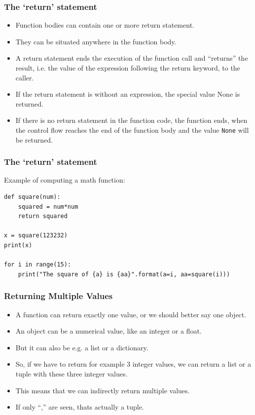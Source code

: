 \begin{frame}[fragile]\frametitle{The `return' statement }
    \begin{itemize}
    \item  Function bodies can contain one or more return statement. 
    \item They can be situated anywhere in the function body. 
    \item A return statement ends the execution of the function call and ``returns'' the result, i.e. the value of the expression following the return keyword, to the caller.
    \item If the return statement is without an expression, the special value None is returned.
    \item If there is no return statement in the function code, the function ends, when the control flow reaches the end of the function body and the value \texttt{None} will be returned.
    \end{itemize}
\end{frame}



\begin{frame}[fragile]\frametitle{The `return' statement }
Example of computing a math function:
\begin{lstlisting}
def square(num):
    squared = num*num
    return squared

x = square(123232)
print(x)

for i in range(15):
    print("The square of {a} is {aa}".format(a=i, aa=square(i)))
\end{lstlisting}
\end{frame}

\begin{frame}[fragile]\frametitle{Returning Multiple Values}
    \begin{itemize}
    \item  A function can return exactly one value, or we should better say one object. 
    \item An object can be a numerical value, like an integer or a float. 
    \item But it can also be e.g. a list or a dictionary. 
    \item So, if we have to return for example 3 integer values, we can return a list or a tuple with these three integer values. 
    \item This means that we can indirectly return multiple values.
    \item If only ``,'' are seen, thats actually a tuple.
        \end{itemize}
\end{frame}

